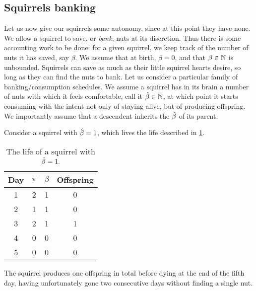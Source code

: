 \subsection{Squirrels banking}
Let us now give our squirrels some autonomy, since at this point they have none. We allow a squirrel
to save, or \textit{bank}, nuts at its discretion. Thus there is some accounting work to be done:
for a given squirrel, we keep track of the number of nuts it has saved, say $\beta$. We assume
that at birth, $\beta = 0$, and that $\beta\in\mathbb{N}$ is unbounded. Squirrels can save as much
as their little squirrel hearts desire, so long as they can find the nuts to bank. Let us consider
a particular family of banking/consumption schedules. We assume a squirrel has in its brain a 
number of nuts with which it feels comfortable, call it $\hat{\beta}\in\mathbb{N}$, at which point it starts 
consuming with the intent not only of staying alive, but of producing offspring. We importantly
assume that a descendent inherits the $\hat{\beta}$ of its parent. 

\begin{example}
Consider a squirrel with $\hat{\beta} = 1$, which lives the life described in \ref{tab:eglife}.
\begin{table}[]
    \centering
\begin{tabular}{|c||c|c|c|}\hline
Day & $\pi$ & $\beta$ & Offspring \\\hline
1   & 2                  & 1                    & 0         \\
2   & 1                  & 1                    & 0         \\
3   & 2                  & 1                    & 1         \\
4   & 0                  & 0                    & 0         \\
5   & 0                  & 0                    & 0        \\\hline
\end{tabular}
\caption{The life of a squirrel with $\hat{\beta} = 1.$}
\label{tab:eglife}
\end{table} 
The squirrel produces one offspring in total before dying at the end of the fifth day, having
unfortunately gone two consecutive days without finding a single nut. 
\end{example}

